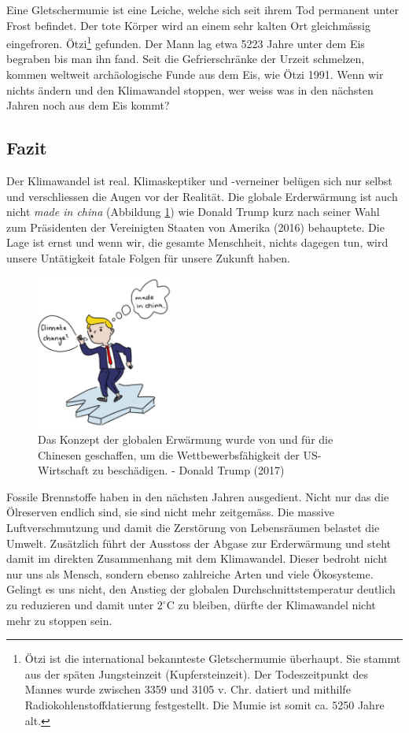 \begin{refsection}
{Eine Gletschermumie ist eine Leiche, welche sich seit ihrem Tod permanent unter Frost befindet. Der tote Körper wird an einem sehr kalten Ort gleichmässig eingefroren.}
Ötzi\footnote{%
Ötzi ist die international bekannteste Gletschermumie überhaupt. Sie stammt aus der späten Jungsteinzeit (Kupfersteinzeit). Der Todeszeitpunkt des Mannes wurde zwischen 3359 und 3105 v. Chr. datiert und mithilfe Radiokohlenstoffdatierung festgestellt. Die Mumie ist somit ca. 5250 Jahre alt.}
gefunden. Der Mann lag etwa 5223 Jahre unter dem Eis begraben bis man ihn fand. Seit die Gefrierschränke der Urzeit schmelzen, kommen weltweit archäologische Funde aus dem Eis, wie Ötzi 1991. Wenn wir nichts ändern und den Klimawandel stoppen, wer weiss was in den nächsten Jahren noch aus dem Eis kommt?


\subsection{Fazit}
Der Klimawandel ist real. Klimaskeptiker und -verneiner belügen sich nur selbst und verschliessen die Augen vor der Realität. Die globale Erderwärmung ist auch nicht \textit{made in china} (Abbildung \ref{DTrump}) wie Donald Trump kurz nach seiner Wahl zum Präsidenten der Vereinigten Staaten von Amerika (2016) behauptete. Die Lage ist ernst und wenn wir, die gesamte Menschheit, nichts dagegen tun, wird unsere Untätigkeit fatale Folgen für unsere Zukunft haben.

\begin{figure}
\centering
\includegraphics[width=0.4\textwidth]{extrem/Trump.pdf}
\caption{Das Konzept der globalen Erwärmung wurde von und für die Chinesen geschaffen, um die Wettbewerbsfähigkeit der US-Wirtschaft zu beschädigen. - Donald Trump (2017)}
\label{DTrump}
\end{figure}



Fossile Brennstoffe haben in den nächsten Jahren ausgedient. Nicht nur das die Ölreserven endlich sind, sie sind nicht mehr zeitgemäss. Die massive Luftverschmutzung und damit die Zerstörung von Lebensräumen belastet die Umwelt. Zusätzlich führt der Ausstoss der Abgase zur Erderwärmung und steht damit im direkten Zusammenhang mit dem Klimawandel.
Dieser bedroht nicht nur uns als Mensch, sondern ebenso zahlreiche Arten und viele Ökosysteme. Gelingt es uns nicht, den Anstieg der globalen Durchschnittstemperatur deutlich zu reduzieren und damit unter $2^{\circ}$C zu bleiben, dürfte der Klimawandel nicht mehr zu stoppen sein.


\end{refsection}
